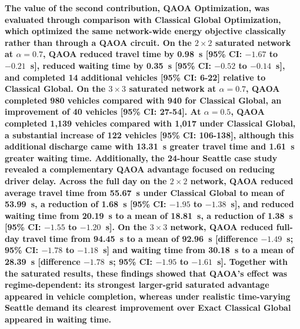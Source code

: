 \textbf{
The value of the second contribution, QAOA Optimization, was evaluated through comparison with Classical Global Optimization, which optimized the same network-wide energy objective classically rather than through a QAOA circuit. On the $2\times2$ saturated
network at $\alpha=0.7$, QAOA reduced travel time by 0.98~s
[95\% CI: $-1.67$ to $-0.21$~s], reduced waiting time by 0.35~s
[95\% CI: $-0.52$ to $-0.14$~s], and completed 14 additional vehicles
[95\% CI: 6-22] relative to Classical Global. On the $3\times3$ saturated network at $\alpha=0.7$, QAOA completed 980 vehicles compared with 940 for Classical Global, an improvement of 40 vehicles
[95\% CI: 27-54]. At $\alpha=0.5$, QAOA completed 1,139 vehicles compared with
1,017 under Classical Global, a substantial increase of 122 vehicles
[95\% CI: 106-138], although this additional discharge came with
13.31~s greater travel time and 1.61~s greater waiting time. Additionally, the 24-hour Seattle case study revealed a complementary QAOA advantage focused on
reducing driver delay. Across the full day on the
$2\times2$ network, QAOA reduced average travel time from 55.67~s under
Classical Global to mean of 53.99~s, a reduction of 1.68~s
[95\% CI: $-1.95$ to $-1.38$~s], and reduced waiting time from 20.19~s
to a mean of 18.81~s, a reduction of 1.38~s
[95\% CI: $-1.55$ to $-1.20$~s]. On the $3\times3$ network, QAOA reduced
full-day travel time from 94.45~s to a mean of 92.96~s
[difference $-1.49$~s; 95\% CI: $-1.78$ to $-1.18$~s] and waiting time
from 30.18~s to a mean of 28.39~s
[difference $-1.78$~s; 95\% CI: $-1.95$ to $-1.61$~s].
Together with the saturated results, these findings showed that QAOA's effect was
regime-dependent: its strongest larger-grid saturated advantage appeared in
vehicle completion, whereas under realistic time-varying Seattle demand its
clearest improvement over Exact Classical Global appeared in waiting
time.
}

